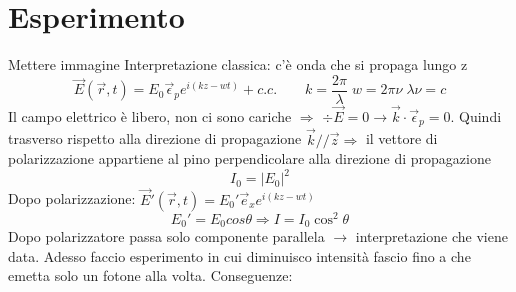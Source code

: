 \documentclass[a4paper,11pt]{report}
\theoremstyle{remark}
\theoremstyle{definition}
\begin{document}
\section*{Esperimento}
Mettere immagine \newline
Interpretazione classica: c'è onda che si propaga lungo z
\begin{equation*}
    \vec{E}(\vec{r},t) = E_0 \vec{\epsilon}_p e^{i(kz-wt)}+ c.c. \qquad k = \frac{2\pi}{\lambda} \; w = 2\pi\nu \; \lambda\nu = c
\end{equation*} 
Il campo elettrico è libero, non ci sono cariche $\Rightarrow$ $\div\vec{E}=0 \rightarrow \vec{k}\cdot \vec{\epsilon}_p =0$. Quindi trasverso rispetto alla direzione di propagazione \newline
$\vec{k} // \vec{z} \Rightarrow$ il vettore di polarizzazione appartiene al pino perpendicolare alla direzione di propagazione
\begin{equation*}
    I_0 = {|E_0|}^2
\end{equation*} 
Dopo polarizzazione: $\vec{E}'(\vec{r},t) = E_0'\vec{e}_x e^{i(kz-wt)}$
\begin{equation*}
    E_0' = E_0 cos\theta \Rightarrow I = I_0 \cos^2\theta
\end{equation*}
Dopo polarizzatore passa solo componente parallela $\rightarrow$ interpretazione che viene data. \newline
Adesso faccio esperimento in cui diminuisco intensità fascio fino a che emetta solo un fotone alla volta. Conseguenze:
\end{document}
